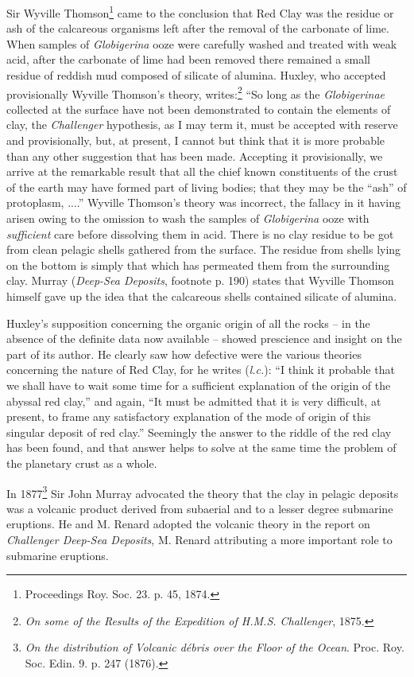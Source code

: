 \documentclass[a4paper, 12pt, oneside]{article}
\begin{document}
Sir Wyville Thomson\footnote{Proceedings Roy. Soc. 23. p. 45, 1874.} came to the conclusion that Red Clay was the residue or ash of the calcareous organisms left after the removal of the carbonate of lime. When samples of \emph{Globigerina} ooze were carefully washed and treated with weak acid, after the carbonate of lime had been removed there remained a small residue of reddish mud composed of silicate of alumina. Huxley, who accepted provisionally Wyville Thomson's theory, writes:\footnote{\emph{On some of the Results of the Expedition of H.M.S. Challenger}, 1875.} ``So long as the \emph{Globigerinae} collected at the surface have not been demonstrated to contain the elements of clay, the \emph{Challenger} hypothesis, as I may term it, must be accepted with reserve and provisionally, but, at present, I cannot but think that it is more probable than any other suggestion that has been made. Accepting it provisionally, we arrive at the remarkable result that all the chief known constituents of the crust of the earth may have formed part of living bodies; that they may be the ``ash'' of protoplasm, ....'' Wyville Thomson's theory was incorrect, the fallacy in it having arisen owing to the omission to wash the samples of \emph{Globigerina} ooze with \emph{sufficient} care before dissolving them in acid. There is no clay residue to be got from clean pelagic shells gathered from the surface. The residue from shells lying on the bottom is simply that which has permeated them from the surrounding clay. Murray (\emph{Deep-Sea Deposits}, footnote p. 190) states that Wyville Thomson himself gave up the idea that the calcareous shells contained silicate of alumina.

Huxley's supposition concerning the organic origin of all the rocks -- in the absence of the definite data now available -- showed prescience and insight on the part of its author. He clearly saw how defective were the various theories concerning the nature of Red Clay, for he writes (\emph{l.c.}): ``I think it probable that we shall have to wait some time for a sufficient explanation of the origin of the abyssal red clay,'' and again, ``It must be admitted that it is very difficult, at present, to frame any satisfactory explanation of the mode of origin of this singular deposit of red clay.'' Seemingly the answer to the riddle of the red clay has been found, and that answer helps to solve at the same time the problem of the planetary crust as a whole.

In 1877\footnote{\emph{On the distribution of Volcanic débris over the Floor of the Ocean}. Proc. Roy. Soc. Edin. 9. p. 247 (1876).} Sir John Murray advocated the theory that the clay in pelagic deposits was a volcanic product derived from subaerial and to a lesser degree submarine eruptions. He and M. Renard adopted the volcanic theory in the report on \emph{Challenger Deep-Sea Deposits}, M. Renard attributing a more important role to submarine eruptions.
\end{document}
